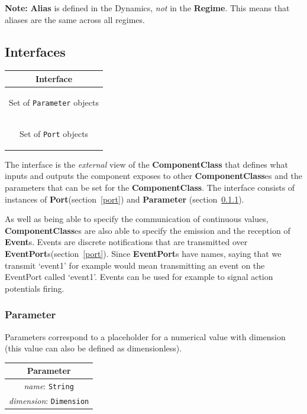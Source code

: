 \documentclass{article}
\newcommand{\note}[1]{%
\begin{center}
\colorbox{issuecolor}{\parbox{0.8\linewidth}{\textbf{Note:} #1}}
\end{center}%
}
\newcommand{\ComponentClass}{{\bf{ComponentClass}}\xspace}
\newcommand{\ComponentClasses}{{\bf{ComponentClass}}es\xspace}
\newcommand{\Alias}{{\bf{Alias}}\xspace}
\newcommand{\EventPorts}{{\bf{EventPort}}s\xspace}
\newcommand{\Port}{{\bf{Port}}\xspace}
\newcommand{\Events}{{\bf{Event}}s\xspace}
\newcommand{\Regime}{{\bf{Regime}}\xspace}
\newcommand{\Parameter}{{\bf{Parameter}}\xspace}
\begin{document}
\note{\Alias is defined in the Dynamics, \emph{not} in the
\Regime. This means that aliases are the same across all regimes.}

\subsection{Interfaces}

\begin{table}[htb]
\center
\begin{tabular}{|c|}
\hline
\hline
Interface \\
\hline
\colorbox{issuecolor}{\parbox{0.4\linewidth}
{\center Set of {\tt Parameter} objects}} \\
\hline
\colorbox{issuecolor}{\parbox{0.4\linewidth}
{\center Set of {\tt Port} objects}} \\
\hline
\end{tabular}
\end{table}


The interface is the \emph{external} view of the \ComponentClass that defines
what inputs and outputs the component exposes to other \ComponentClasses and the
parameters that can be set for the \ComponentClass. The interface consists of
instances of \Port (section~\ref{port}) and \Parameter
(section~\ref{parameters}).

As well as being able to specify the communication of continuous values,
\ComponentClasses are also able to specify the emission and the reception
of \Events. Events are discrete notifications
that are transmitted over \EventPorts (section~\ref{port}). Since
\EventPorts have names, saying that we transmit `event1' for example
would mean transmitting an event on the EventPort called `event1'. Events
can be used for example to signal action potentials firing.

\subsubsection{Parameter}
\label{parameters}

Parameters correspond to a placeholder for a numerical value with
dimension (this value can also be defined as dimensionless).

\begin{table}[htb]
\center
\begin{tabular}{|c|}
\hline
\hline
Parameter \\
\hline
\hline
{\em name}: {\tt String} \\
\hline
{\em dimension}: {\tt Dimension} \\
\hline
\end{tabular}
\end{table}
\end{document}
